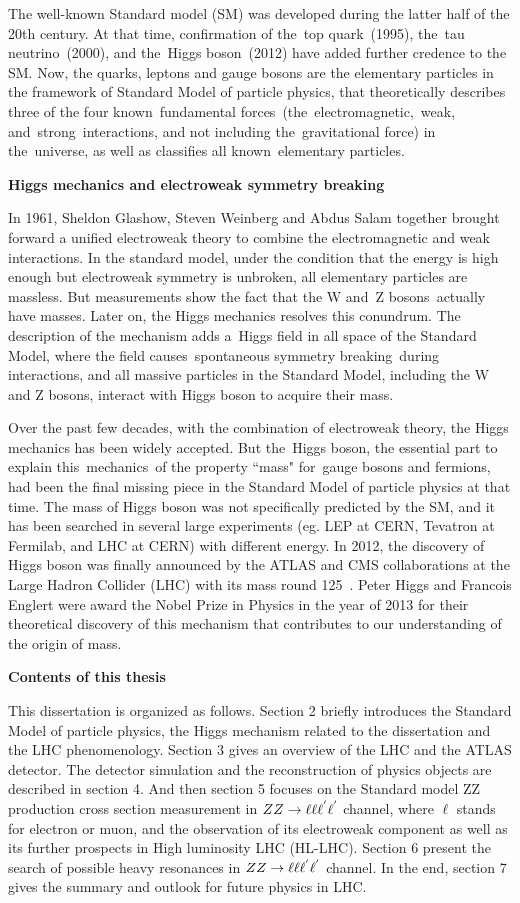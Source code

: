 The well-known Standard model (SM) was developed during the latter half of the 20th century. 
At that time, confirmation of the top quark (1995), the tau neutrino (2000), and the Higgs boson (2012) have added further credence to the SM.
Now, the quarks, leptons and gauge bosons are the elementary particles in the framework of Standard Model of particle physics, 
that theoretically describes three of the four known fundamental forces (the electromagnetic, weak, and strong interactions, and not including the gravitational force) in the universe, 
as well as classifies all known elementary particles.

\textbf{Higgs mechanics and electroweak symmetry breaking}

In 1961, Sheldon Glashow, Steven Weinberg and Abdus Salam together brought forward a unified electroweak theory to combine the electromagnetic and weak interactions. 
In the standard model, under the condition that the energy is high enough but electroweak symmetry is unbroken, all elementary particles are massless. 
But measurements show the fact that the W and Z bosons actually have masses. 
Later on, the Higgs mechanics resolves this conundrum. 
The description of the mechanism adds a Higgs field in all space of the Standard Model, 
where the field causes spontaneous symmetry breaking during interactions,
and all massive particles in the Standard Model, including the W and Z bosons, interact with Higgs boson to acquire their mass.

Over the past few decades, with the combination of electroweak theory, the Higgs mechanics has been widely accepted. 
But the Higgs boson, the essential part to explain this mechanics of the property ``mass" for gauge bosons and fermions, had been the final missing piece in the Standard Model of particle physics at that time. 
The mass of Higgs boson was not specifically predicted by the SM, and it has been searched in several large experiments (eg. LEP at CERN, Tevatron at Fermilab, and LHC at CERN) with different energy. 
In 2012, the discovery of Higgs boson was finally announced by the ATLAS and CMS collaborations at the Large Hadron Collider (LHC) with its mass round 125~\gev. 
Peter Higgs and Francois Englert were award the Nobel Prize in Physics in the year of 2013 for their theoretical discovery of 
this mechanism that contributes to our understanding of the origin of mass.

\textbf{Contents of this thesis}

This dissertation is organized as follows. 
Section 2 briefly introduces the Standard Model of particle physics, the Higgs mechanism related to the dissertation and the LHC phenomenology. 
Section 3 gives an overview of the LHC and the ATLAS detector. 
The detector simulation and the reconstruction of physics objects are described in section 4. 
And then section 5 focuses on the Standard model ZZ production cross section measurement in $ZZ \rightarrow \ell\ell\ell^{'}\ell^{'}$ channel, where $\mathrm{\ell}$ stands for electron or muon, 
and the observation of its electroweak component as well as its further prospects in High luminosity LHC (HL-LHC). 
Section 6 present the search of possible heavy resonances in $ZZ \rightarrow \ell\ell\ell^{'}\ell^{'}$ channel. 
In the end, section 7 gives the summary and outlook for future physics in LHC.
